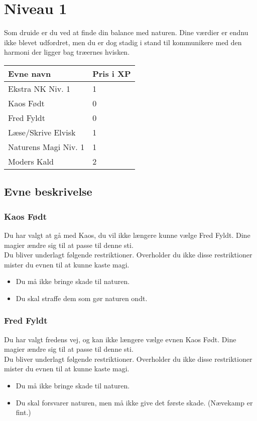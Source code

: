 \chapter{Niveau 1}
Som druide er du ved at finde din balance med naturen. Dine værdier er endnu ikke blevet udfordret, men du er dog stadig i stand til kommunikere med den harmoni der ligger bag træernes hvisken. 

\begin{table}[H]
    \centering
    \begin{tabular}{|p{}|p{}|}
    \rowcolor{cerulean!80}\hline
        Evne navn & Pris i XP \\\hline
        Ekstra NK Niv. 1& 1\\\hline
        Kaos Født & 0 \\\hline
        Fred Fyldt & 0 \\\hline
        Læse/Skrive Elvisk & 1\\\hline
        Naturens Magi Niv. 1& 1\\\hline
        Moders Kald & 2\\\hline
    \end{tabular}
\end{table}

\section{Evne beskrivelse}





\subsection{Kaos Født}
Du har valgt at gå med Kaos, du vil ikke længere kunne vælge Fred Fyldt. Dine magier ændre sig til at passe til denne sti.\\
Du bliver underlagt følgende restriktioner. Overholder du ikke disse restriktioner mister du evnen til at kunne kaste magi.
\begin{itemize}
    \item Du må ikke bringe skade til naturen.
    \item Du skal straffe dem som gør naturen ondt.
\end{itemize}

\subsection{Fred Fyldt}
Du har valgt fredens vej, og kan ikke længere vælge evnen Kaos Født. Dine magier ændre sig til at passe til denne sti.\\
Du bliver underlagt følgende restriktioner. Overholder du ikke disse restriktioner mister du evnen til at kunne kaste magi.
\begin{itemize}
    \item Du må ikke bringe skade til naturen.
    \item Du skal forsvarer naturen, men må ikke give det første skade. (Nævekamp er fint.)
\end{itemize}

